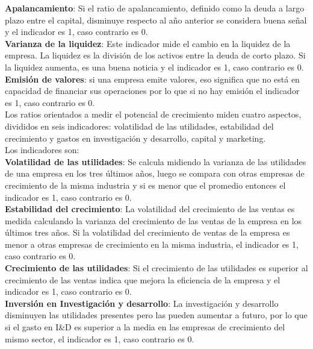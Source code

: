 \textbf{Apalancamiento}: Si el ratio de apalancamiento, definido como la deuda a largo plazo entre el capital, disminuye respecto al año anterior se considera buena señal y el indicador es 1, caso contrario es 0.\\

\textbf{Varianza de la liquidez}: Este indicador mide el cambio en la liquidez de la empresa. La liquidez es la división de los activos entre la deuda de corto plazo. Si la liquidez aumenta, es una buena noticia y el indicador es 1, caso contrario es 0.\\

\textbf{Emisión de valores}: si una empresa emite valores, eso significa que no está en capacidad de financiar sus operaciones por lo que si no hay emisión el indicador es 1, caso contrario es 0.\\

Los ratios orientados a medir el potencial de crecimiento miden cuatro aspectos, divididos en seis indicadores: volatilidad de las utilidades, estabilidad del crecimiento y gastos en investigación y desarrollo, capital y marketing.\\

Los indicadores son:\\

\textbf{Volatilidad de las utilidades}: Se calcula midiendo la varianza de las utilidades de una empresa en los tres últimos años, luego se compara con otras empresas de crecimiento de la misma industria y si es menor que el promedio entonces el indicador es 1, caso contrario es 0.\\

\textbf{Estabilidad del crecimiento}: La volatilidad del crecimiento de las ventas es medida calculando la varianza del crecimiento de las ventas de la empresa en los últimos tres años. Si la volatilidad del crecimiento de ventas de la empresa es menor a otras empresas de crecimiento en la misma industria, el indicador es 1, caso contrario es 0.\\

\textbf{Crecimiento de las utilidades}: Si el crecimiento de las utilidades es superior al crecimiento de las ventas indica que mejora la eficiencia de la empresa y el indicador es 1, caso contrario es 0.\\

\textbf{Inversión en Investigación y desarrollo}: La investigación y desarrollo disminuyen las utilidades presentes pero las pueden aumentar a futuro, por lo que si el gasto en I\&D es superior a la media en las empresas de crecimiento del mismo sector, el indicador es 1, caso contrario es 0.\\

